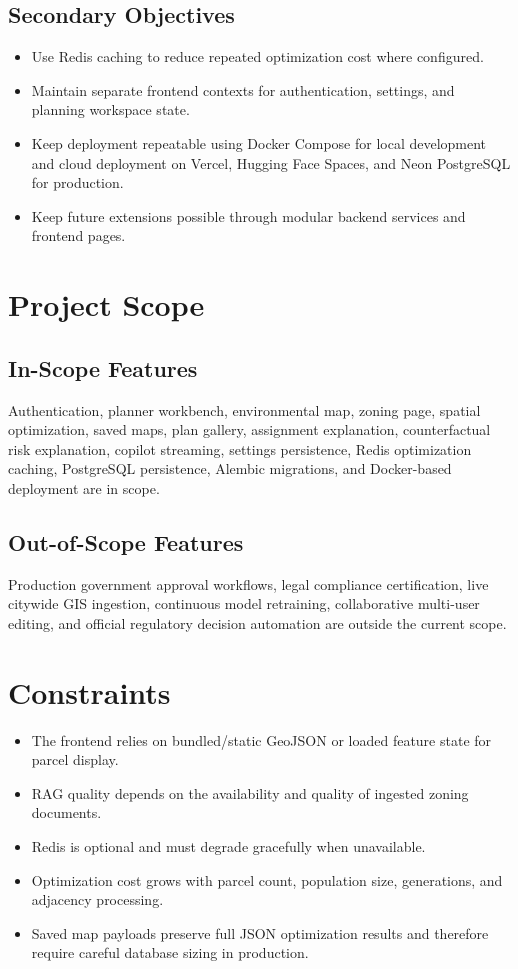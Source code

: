 \documentclass[12pt,a4paper,oneside]{report}
\begin{document}
\subsection{Secondary Objectives}
\begin{itemize}
  \item Use Redis caching to reduce repeated optimization cost where configured.
  \item Maintain separate frontend contexts for authentication, settings, and planning workspace state.
  \item Keep deployment repeatable using Docker Compose for local development and cloud deployment on Vercel, Hugging Face Spaces, and Neon PostgreSQL for production.
  \item Keep future extensions possible through modular backend services and frontend pages.
\end{itemize}

\section{Project Scope}
\subsection{In-Scope Features}
Authentication, planner workbench, environmental map, zoning page, spatial optimization, saved maps, plan gallery, assignment explanation, counterfactual risk explanation, copilot streaming, settings persistence, Redis optimization caching, PostgreSQL persistence, Alembic migrations, and Docker-based deployment are in scope.

\subsection{Out-of-Scope Features}
Production government approval workflows, legal compliance certification, live citywide GIS ingestion, continuous model retraining, collaborative multi-user editing, and official regulatory decision automation are outside the current scope.

\section{Constraints}
\begin{itemize}
  \item The frontend relies on bundled/static GeoJSON or loaded feature state for parcel display.
  \item RAG quality depends on the availability and quality of ingested zoning documents.
  \item Redis is optional and must degrade gracefully when unavailable.
  \item Optimization cost grows with parcel count, population size, generations, and adjacency processing.
  \item Saved map payloads preserve full JSON optimization results and therefore require careful database sizing in production.
\end{itemize}
\end{document}
